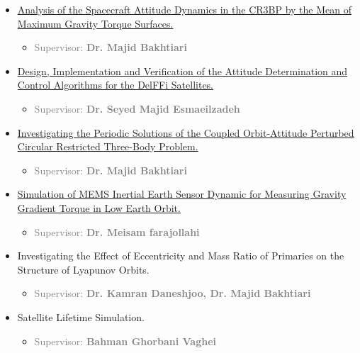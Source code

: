 \documentclass[10pt,a4paper,times]{moderncv}
\begin{document}
\begin{itemize}

\item \href{https://www.researchgate.net/publication/349479363_Max_Gravity_Surfaces?_tp=eyJjb250ZXh0Ijp7ImZpcnN0UGFnZSI6InByb2ZpbGUiLCJwYWdlIjoicHJvZmlsZSJ9fQ}{Analysis of the Spacecraft Attitude Dynamics in the CR3BP by the Mean of Maximum Gravity Torque Surfaces.}
\begin{itemize}
	\item \textcolor{gray}{Supervisor: \textbf{Dr. Majid Bakhtiari } }
\end{itemize}

\item \href{https://github.com/siavashsabzy/DelFFi}{Design, Implementation and Verification of the Attitude Determination and Control Algorithms for the DelFFi Satellites.}
\begin{itemize}
	\item \textcolor{gray}{Supervisor: \textbf{ Dr. Seyed Majid Esmaeilzadeh} }
\end{itemize}

\item \href{https://link.springer.com/article/10.1007/s42064-022-0154-0}{Investigating the Periodic Solutions of the Coupled Orbit-Attitude Perturbed Circular Restricted Three-Body Problem. }
\begin{itemize}
	\item \textcolor{gray}{Supervisor: \textbf{Dr. Majid Bakhtiari} }
\end{itemize}


\item \href{https://github.com/siavashsabzy/Gravity-Gradient-MEMS-Sensor}{Simulation of MEMS Inertial Earth Sensor Dynamic for Measuring Gravity Gradient Torque in Low Earth Orbit.}
\begin{itemize}
	\item \textcolor{gray}{Supervisor: \textbf{Dr. Meisam farajollahi} }
\end{itemize}


\item Investigating the Effect of Eccentricity and Mass Ratio of Primaries on the Structure of Lyapunov Orbits.
\begin{itemize}
	\item \textcolor{gray}{Supervisor: \textbf{Dr. Kamran Daneshjoo, Dr. Majid Bakhtiari}}
\end{itemize}

\item Satellite Lifetime Simulation.
\begin{itemize}
	\item \textcolor{gray}{Supervisor: \textbf{Bahman Ghorbani Vaghei} }
\end{itemize}
\end{itemize}
\end{document}

